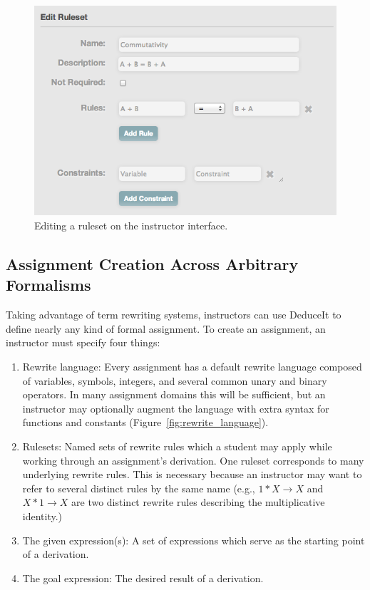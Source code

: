 \documentclass{sigchi}
\begin{document}
\begin{figure}[tb]
\centering
\includegraphics[width=1\columnwidth]{editruleset}
\caption{Editing a ruleset on the instructor interface.}
\label{fig:editruleset}
\end{figure}

\subsection{Assignment Creation Across Arbitrary Formalisms}

Taking advantage of term rewriting systems, instructors can use DeduceIt to define nearly any kind of formal assignment. To create an assignment, an instructor must specify four things: 
  \begin{enumerate}
  \item Rewrite language: Every assignment has a default rewrite language composed of variables, symbols, integers, and several common unary and binary operators. In many assignment domains this will be sufficient, but an instructor may optionally augment the language with extra syntax for functions and constants (Figure~\ref{fig:rewrite_language}). 
  \item Rulesets: Named sets of rewrite rules which a student may apply while working through an assignment's derivation. One ruleset corresponds to many underlying rewrite rules. This is necessary because an instructor may want to refer to several distinct rules by the same name (e.g., $1*X \rightarrow X$ and $X*1 \rightarrow X$ are two distinct rewrite rules describing the multiplicative identity.)
  \item The given expression(s): A set of expressions which serve as the starting point of a derivation.
  \item The goal expression: The desired result of a derivation.
  \end{enumerate}
\end{document}
